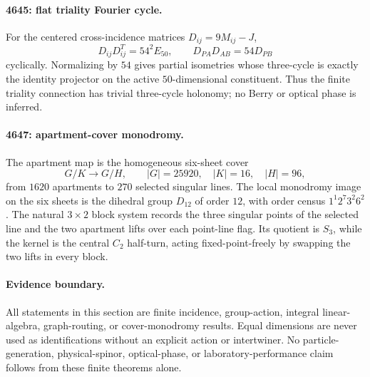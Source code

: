\paragraph{4645: flat triality Fourier cycle.}
For the centered cross-incidence matrices $D_{ij}=9M_{ij}-J$,
\[
D_{ij}D_{ij}^T=54^2E_{50},
\qquad
D_{PA}D_{AB}=54D_{PB}
\]
cyclically.  Normalizing by $54$ gives partial isometries whose three-cycle is
exactly the identity projector on the active $50$-dimensional constituent.
Thus the finite triality connection has trivial three-cycle holonomy; no Berry or
optical phase is inferred.

\paragraph{4647: apartment-cover monodromy.}
The apartment map is the homogeneous six-sheet cover
\[
G/K\longrightarrow G/H,
\qquad |G|=25920,\quad |K|=16,\quad |H|=96,
\]
from $1620$ apartments to $270$ selected singular lines.  The local monodromy
image on the six sheets is the dihedral group $D_{12}$ of order $12$, with
order census $1^1 2^7 3^2 6^2$.  The natural $3\times2$ block system records
the three singular points of the selected line and the two apartment lifts over
each point-line flag.  Its quotient is $S_3$, while the kernel is the central
$C_2$ half-turn, acting fixed-point-freely by swapping the two lifts in every
block.

\paragraph{Evidence boundary.}
All statements in this section are finite incidence, group-action, integral
linear-algebra, graph-routing, or cover-monodromy results.  Equal dimensions are
never used as identifications without an explicit action or intertwiner.  No
particle-generation, physical-spinor, optical-phase, or laboratory-performance
claim follows from these finite theorems alone.
